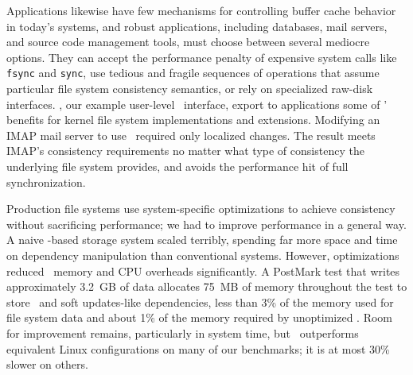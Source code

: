 Applications likewise have few mechanisms
 for controlling buffer cache behavior in today's systems, and
%
robust applications, including databases, mail servers, and source code
 management tools, must choose between several mediocre options.
%
They can accept the performance penalty of expensive system calls like
 \texttt{fsync} and \texttt{sync}, use tedious and fragile sequences
 of operations that assume particular file system consistency semantics, or
 rely on specialized raw-disk interfaces.
%
\emph{\Patchgroups}, our example user-level \patch\ interface,
 export to applications some of \patches' benefits
 for kernel file system implementations and extensions.
%
Modifying an IMAP mail server to use \patchgroups\ required only localized
 changes.  The result meets IMAP's consistency requirements no
 matter what type of consistency the underlying file system provides, and
 avoids the performance hit of full synchronization.


\begin{comment}
Our file system modules impose soft updates-style \patch\ requirements by
 default, since doing so requires some knowledge of the file system's
 structures; we have also written a journal module that can change
 existing dependencies to express either full or metadata-only journaling.
%
A file system module not interested in supporting soft updates support
 could instead impose no \patch\ requirements, and count on the journal
 module to provide a consistency guarantee.


The \Kudos\ storage system implementation is decomposed entirely into
 pluggable \modules\ that manipulate \patches, hopefully making the system
 as a whole more configurable, extensible, and easier to understand.
%
Any storage system \module\ can generate \patches; other modules can examine
 them and modify them when required.
%
\Patch\ dependencies are obeyed by all other storage system layers, allowing
 them to be passed through layers such as loopback block devices.
%
As a result, the loosely-coupled \modules\ that implement a file system
 can cooperate to enforce strong and often complex consistency guarantees,
 even though each \module\ only does a small part of the work.
\end{comment}


Production file systems use system-specific optimizations to achieve
 consistency without sacrificing performance; we had to improve
 performance in a general way.
%
A naive \patch-based storage system scaled terribly,
 spending far more space and time on dependency manipulation than
 conventional systems.
%
However, optimizations reduced \patch\ memory and
 CPU overheads significantly.
%
A PostMark test that writes approximately 3.2~GB of data
 allocates 75~MB of memory throughout the test to store \patches\ and
 soft updates-like dependencies, less than 3\% of the memory used for file
 system data and about 1\% of the memory required by unoptimized
 \Featherstitch.
%
Room for improvement remains, particularly in system time, but
 \Featherstitch\ outperforms equivalent Linux configurations on
 many of our benchmarks; it is at most 30\% slower on others.


